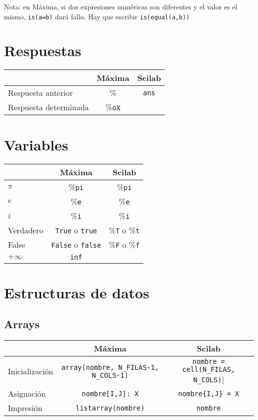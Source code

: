 \documentclass[a4paper]{article}
\begin{document}
Nota: en Máxima, si dos expresiones numéricas son diferentes y el valor es el mismo, \verb|is(a=b)| dará fallo. Hay que escribir \verb|is(equal(a,b))|
\raggedright
\section{Respuestas}
 \centering
\begin{tabular}{lcc}
	& Máxima & Scilab \\ \midrule
	Respuesta anterior & \% & \verb|ans| \\
	Respuesta determinada & \%\verb|oX| &   \\
\end{tabular}

\raggedright
\section{Variables}
\centering
\begin{tabular}{lcc}
	& Máxima & Scilab \\ \midrule
	$\pi$ & \%\verb|pi| & \%\verb|pi| \\
	$e$ & \%\verb|e| & \%\verb|e|  \\
	$i$ & \%\verb|i| & \%\verb|i| \\
	Verdadero & \verb|True| o \verb|true| &  \%\verb|T| o \%\verb|t| \\
	False & \verb|False| o \verb|false| &  \%\verb|F| o \%\verb|f| \\
	$+\infty$ & \verb|inf| &   \\
\end{tabular}


\raggedright
\section{Estructuras de datos}
\subsection{Arrays}
\centering
\begin{tabular}{lcc}
	& Máxima & Scilab \\ \midrule
 Inicialización & \verb|array(nombre, N_FILAS-1, N_COLS-1)| & 
 				  \verb|nombre = cell(N_FILAS, N_COLS)|| \\
	Asignación & \verb|nombre[I,J]: X| & \verb|nombre{I,J} = X|  \\
Impresión & \verb|listarray(nombre)| & \verb|nombre| \\
\end{tabular}
\end{document}
